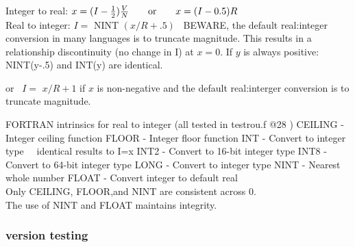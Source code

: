 \documentclass{article}
\begin{document}
Integer to real: $x=(I-\frac{1}{2})\frac{V}{N}  \hspace{7mm} \mathrm{or} \hspace{7mm}  x=(I-0.5)R $
\\ Real to integer:  $I=$ NINT $( x/R +.5 )$ \ 
\qi BEWARE, the default real:integer conversion in many languages is to truncate magnitude. 
\qii This results in a relationship discontinuity (no change in I) at $x=0$.
\qiii If $y$ is always positive: NINT(y-.5) and INT(y) are identical.
 
or \  $I=$ $ x/R + 1$ if $x$ is non-negative and the default real:interger conversion is to truncate magnitude.

FORTRAN intrinsics for real to integer (all tested in testrou.f @28 )
\qi CEILING - Integer ceiling function
\qi FLOOR - Integer floor function
\qi INT - Convert to integer type    \ \ identical results to I=x
\qii INT2 - Convert to 16-bit integer type
\qii INT8 - Convert to 64-bit integer type
\qii LONG - Convert to integer type
\qi NINT - Nearest whole number
\qi FLOAT - Convert integer to default real
\\ Only CEILING, FLOOR,and NINT are consistent across 0. 
\\ The use of NINT and FLOAT maintains integrity. 

\subsubsection {version testing}
 
\end{document}
